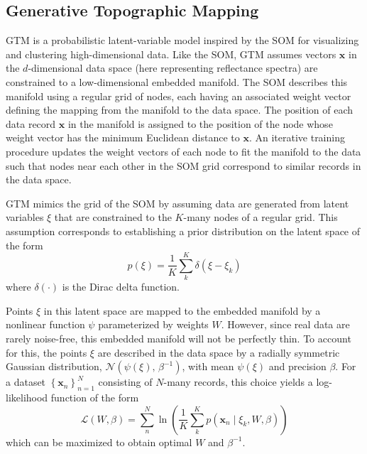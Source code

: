 \subsection{Generative Topographic Mapping}\label{sec:gtm-overview}

GTM is a probabilistic latent-variable model inspired by the  SOM for visualizing and clustering high-dimensional data. Like the  SOM, GTM assumes vectors $\mathbf{x}$ in the $d$-dimensional data space (here representing reflectance spectra) are constrained to a low-dimensional embedded manifold. The SOM describes this manifold using a regular grid of nodes, each having an associated weight vector defining the mapping from the manifold to the data space. The position of each data record $\mathbf{x}$ in the manifold is assigned to the position of the node whose weight vector has the minimum Euclidean distance to $\mathbf{x}$. An iterative training procedure updates the weight vectors of each node to fit the manifold to the data such that nodes near each other in the SOM grid correspond to similar records in the data space.

GTM mimics the grid of the SOM by assuming data are generated from latent variables $\xi$ that are constrained to the $K$-many nodes of a regular grid. This assumption corresponds to establishing a prior distribution on the latent space of the form
\begin{equation}\label{eq:latent-prob}
    p(\xi) = \frac{1}{K}\sum_k^K \delta(\xi - \xi_k)
\end{equation}
where $\delta(\cdot)$ is the Dirac delta function.

Points $\xi$ in this latent space are mapped to the embedded manifold by a nonlinear function $\psi$ parameterized by weights $W$. However, since real data are rarely noise-free, this embedded manifold will not be perfectly thin. To account for this, the points $\xi$ are described in the data space by a radially symmetric Gaussian distribution, $\mathcal{N}(\psi(\xi),\, \beta^{-1})$, with mean $\psi(\xi)$ and precision $\beta$. For a dataset $\left\{ \mathbf{x}_n\right\}_{n=1}^N$ consisting of $N$-many records, this choice yields a log-likelihood function of the form
\begin{equation}\label{eq:llh}
    \mathcal{L}(W, \beta) = \sum_n^N \ln \left(\dfrac{1}{K}\sum_k^K p(\mathbf{x}_n \mid \xi_k, W, \beta) \right)
\end{equation}
which can be maximized to obtain optimal $W$ and $\beta^{-1}$.

